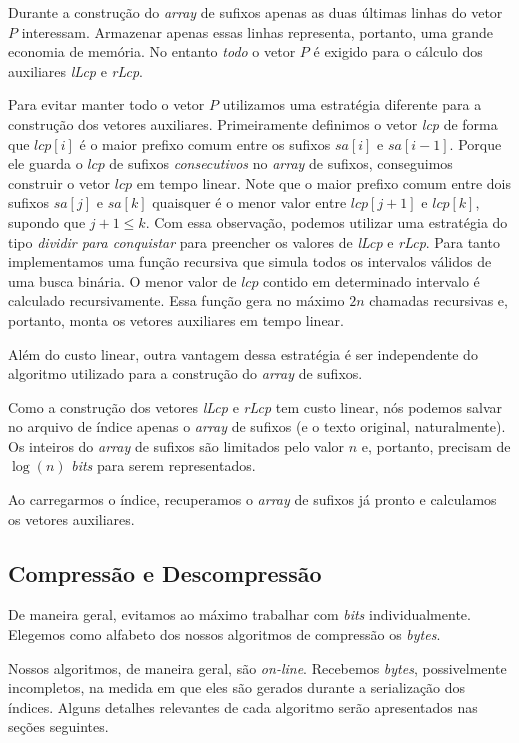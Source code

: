 \documentclass[]{article}
\begin{document}
Durante a construção do \textit{array} de sufixos apenas as duas últimas linhas do vetor $P$ interessam. Armazenar apenas essas linhas representa, portanto, uma grande economia de memória. No entanto \textit{todo} o vetor $P$ é exigido para o cálculo dos auxiliares \textit{lLcp} e \textit{rLcp}.

Para evitar manter todo o vetor $P$ utilizamos uma estratégia diferente para a construção dos vetores auxiliares. Primeiramente definimos o vetor \textit{lcp} de forma que $lcp[i]$ é o maior prefixo comum entre os sufixos $sa[i]$ e $sa[i-1]$. Porque ele guarda o $lcp$ de sufixos \textit{consecutivos} no \textit{array} de sufixos, conseguimos construir o vetor $lcp$ em tempo linear. Note que o maior prefixo comum entre dois sufixos $sa[j]$ e $sa[k]$ quaisquer é o menor valor entre $lcp[j+1]$ e $lcp[k]$, supondo que $j+1 \leq k$. Com essa observação, podemos utilizar uma estratégia do tipo \textit{dividir para conquistar} para preencher os valores de \textit{lLcp} e \textit{rLcp}. Para tanto implementamos uma função recursiva que simula todos os intervalos válidos de uma busca binária. O menor valor de $lcp$ contido em determinado intervalo é calculado recursivamente. Essa função gera no máximo $2n$ chamadas recursivas e, portanto, monta os vetores auxiliares em tempo linear.

Além do custo linear, outra vantagem dessa estratégia é ser independente do algoritmo utilizado para a construção do \textit{array} de sufixos.

Como a construção dos vetores \textit{lLcp} e \textit{rLcp} tem custo linear, nós podemos salvar no arquivo de índice apenas o \textit{array} de sufixos (e o texto original, naturalmente). Os inteiros do \textit{array} de sufixos são limitados pelo valor $n$ e, portanto, precisam de $\log(n)$ \textit{bits} para serem representados. 

Ao carregarmos o índice, recuperamos o \textit{array} de sufixos já pronto e calculamos os vetores auxiliares.

\subsection{Compressão e Descompressão}

De maneira geral, evitamos ao máximo trabalhar com \textit{bits} individualmente. Elegemos como alfabeto dos nossos algoritmos de compressão os \textit{bytes}.

Nossos algoritmos, de maneira geral, são \textit{on-line}. Recebemos \textit{bytes}, possivelmente incompletos, na medida em que eles são gerados durante a serialização dos índices. Alguns detalhes relevantes de cada algoritmo serão apresentados nas seções seguintes.
\end{document}
